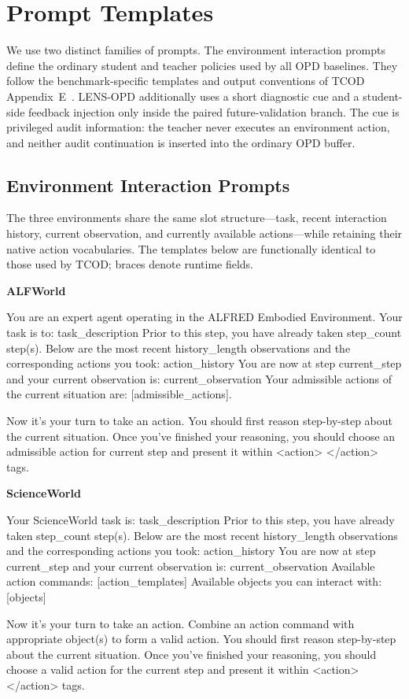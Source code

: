 \documentclass{article}
\newcommand{\promptheading}[1]{%
  \par\medskip\noindent\textbf{#1}\par\nobreak\vspace{3pt}%
}
\begin{document}
\section{Prompt Templates}
\label{app:prompts}

We use two distinct families of prompts.  The environment interaction prompts define the ordinary
student and teacher policies used by all OPD baselines.  They follow the benchmark-specific
templates and output conventions of TCOD Appendix~E~\citep{wang2026tcod}.
LENS-OPD additionally uses a short diagnostic cue and a student-side feedback injection only inside
the paired future-validation branch.  The cue is privileged audit information: the teacher never
executes an environment action, and neither audit continuation is inserted into the ordinary OPD
buffer.

\subsection{Environment Interaction Prompts}

The three environments share the same slot structure---task, recent interaction history, current
observation, and currently available actions---while retaining their native action vocabularies.
The templates below are functionally identical to those used by TCOD; braces denote runtime fields.

\promptheading{ALFWorld}
\begin{promptbox}
You are an expert agent operating in the ALFRED Embodied Environment. Your task is to: {task_description}
Prior to this step, you have already taken {step_count} step(s). Below are the most recent {history_length} observations and the corresponding actions you took: {action_history}
You are now at step {current_step} and your current observation is: {current_observation}
Your admissible actions of the current situation are: [{admissible_actions}].

Now it's your turn to take an action.
You should first reason step-by-step about the current situation.
Once you've finished your reasoning, you should choose an admissible action for current step and present it within <action> </action> tags.
\end{promptbox}

\promptheading{ScienceWorld}
\begin{promptbox}
Your ScienceWorld task is: {task_description}
Prior to this step, you have already taken {step_count} step(s). Below are the most recent {history_length} observations and the corresponding actions you took: {action_history}
You are now at step {current_step} and your current observation is: {current_observation}
Available action commands: [{action_templates}]
Available objects you can interact with: [{objects}]

Now it's your turn to take an action. Combine an action command with appropriate object(s) to form a valid action.
You should first reason step-by-step about the current situation.
Once you've finished your reasoning, you should choose a valid action for the current step and present it within <action> </action> tags.
\end{promptbox}
\end{document}
